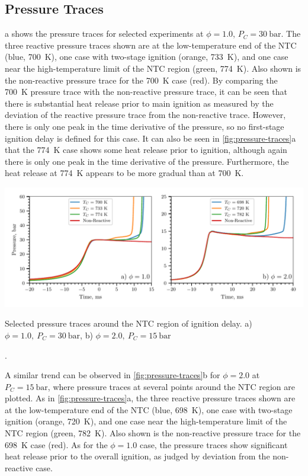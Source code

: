 \documentclass[letterpaper, review, sort&compress]{elsarticle}
\begin{document}
\subsection{Pressure Traces}\label{sec:pressure-traces}

a shows the pressure traces for selected experiments at \(\phi=1.0\),
\(P_C =\SI[number-unit-product={\ }]{30}{\bar}\). The three reactive pressure traces shown are at
the low-temperature end of the NTC (blue, \SI{700}{\K}), one case with two-stage ignition (orange,
\SI{733}{\K}), and one case near the high-temperature limit of the NTC region (green, \SI{774}{\K}).
Also shown is the non-reactive pressure trace for the \SI{700}{\K} case (red). By comparing the
\SI{700}{\K} pressure trace with the non-reactive pressure trace, it can be seen that there is
substantial heat release prior to main ignition as measured by the deviation of the reactive
pressure trace from the non-reactive trace. However, there is only one peak in the time derivative
of the pressure, so no first-stage ignition delay is defined for this case. It can also be seen in
\cref{fig:pressure-traces}a that the \SI{774}{\K} case shows some heat release prior to ignition,
although again there is only one peak in the time derivative of the pressure. Furthermore, the heat
release at \SI{774}{\K} appears to be more gradual than at \SI{700}{\K}.

\begin{center}
    \captionsetup{type=figure}
    \includegraphics[width=\textwidth]{figures/pressure-traces.pdf}
    \caption{Selected pressure traces around the NTC region of ignition delay.
    a) \(\phi=1.0,\ P_C=\SI{30}{\bar}\), b) \(\phi=2.0,\ P_C=\SI{15}{\bar}\)}.
    \label{fig:pressure-traces}
\end{center}

A similar trend can be observed in \cref{fig:pressure-traces}b for \(\phi=2.0\) at
\(P_C=\SI{15}{\bar}\), where pressure traces at several points around the NTC region are plotted. As
in \cref{fig:pressure-traces}a, the three reactive pressure traces shown are at the low-temperature
end of the NTC (blue, \SI{698}{\K}), one case with two-stage ignition (orange, \SI{720}{\K}), and
one case near the high-temperature limit of the NTC region (green, \SI{782}{\K}). Also shown is the
non-reactive pressure trace for the \SI{698}{\K} case (red). As for the \(\phi=1.0\) case, the
pressure traces show significant heat release prior to the overall ignition, as judged by deviation
from the non-reactive case.
\end{document}
